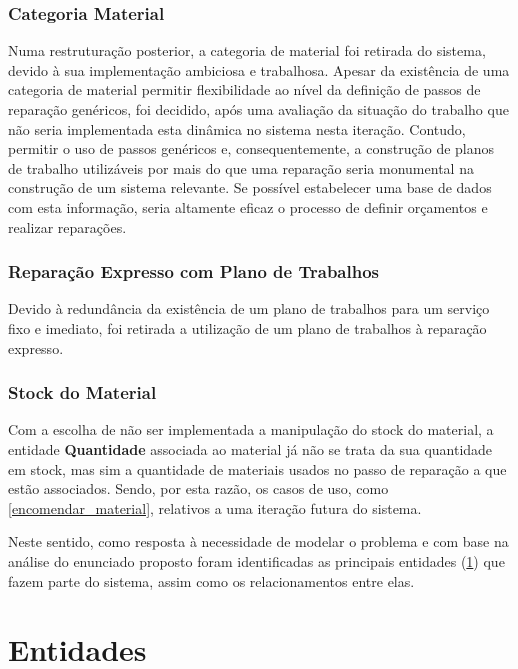 \documentclass[a4paper,12pt]{scrreprt}
\begin{document}
\subsubsection{Categoria Material}

Numa restruturação posterior, a categoria de material foi retirada do sistema, devido à sua implementação ambiciosa e trabalhosa.
Apesar da existência de uma categoria de material permitir flexibilidade ao nível da definição de passos de reparação genéricos, foi decidido, após uma 
avaliação da situação do trabalho que não seria implementada esta dinâmica no sistema nesta iteração. Contudo, permitir o uso de passos genéricos e,
consequentemente, a construção de planos de trabalho utilizáveis por mais do que uma reparação seria monumental na construção de um sistema relevante. 
Se possível estabelecer uma base de dados com esta informação, seria altamente eficaz o processo de definir orçamentos e realizar reparações.

\subsubsection{Reparação Expresso com Plano de Trabalhos}

Devido à redundância da existência de um plano de trabalhos para um serviço fixo e imediato, foi retirada 
a utilização de um plano de trabalhos à reparação expresso. 
    
\subsubsection{Stock do Material}

Com a escolha de não ser implementada a manipulação do stock do material, a entidade \textbf{Quantidade} associada ao material 
já não se trata da sua quantidade em stock, mas sim a quantidade de materiais usados no passo de reparação a que estão associados.
Sendo, por esta razão, os casos de uso, como  \ref{encomendar_material}, relativos a uma iteração futura do sistema.
    


Neste sentido, como resposta à necessidade de modelar o problema e com base na análise do enunciado proposto foram identificadas as 
principais entidades (\ref{ent}) que fazem parte do sistema, assim como os relacionamentos entre elas. 

\section{Entidades}\label{ent}
\end{document}
